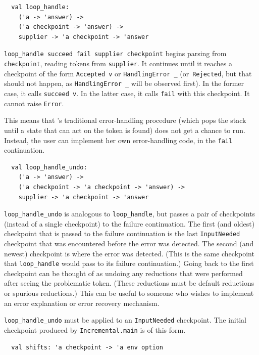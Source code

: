 \documentclass[onecolumn,11pt,nocopyrightspace,preprint]{sigplanconf}
\begin{document}
\begin{verbatim}
  val loop_handle:
    ('a -> 'answer) ->
    ('a checkpoint -> 'answer) ->
    supplier -> 'a checkpoint -> 'answer
\end{verbatim}

\verb+loop_handle succeed fail supplier checkpoint+ begins parsing from
\verb+checkpoint+, reading tokens from \verb+supplier+. It continues until
it reaches a checkpoint of the form \verb+Accepted v+ or \verb+HandlingError _+
(or~\verb+Rejected+, but that should not happen, as \verb+HandlingError _+
will be observed first). In the former case, it calls \verb+succeed v+. In
the latter case, it calls \verb+fail+ with this checkpoint. It cannot
raise \verb+Error+.

This means that \menhir's traditional error-handling procedure (which pops the
stack until a state that can act on the \error token is found) does not get a
chance to run. Instead, the user can implement her own error-handling code, in
the \verb+fail+ continuation.


\begin{verbatim}
  val loop_handle_undo:
    ('a -> 'answer) ->
    ('a checkpoint -> 'a checkpoint -> 'answer) ->
    supplier -> 'a checkpoint -> 'answer
\end{verbatim}

\verb+loop_handle_undo+ is analogous to \verb+loop_handle+, but passes a pair
of checkpoints (instead of a single checkpoint) to the failure continuation.
%
The first (and oldest) checkpoint that is passed to the failure continuation
is the last \verb+InputNeeded+ checkpoint that was encountered before the
error was detected. The second (and newest) checkpoint is where the error was
detected. (This is the same checkpoint that \verb+loop_handle+ would pass to
its failure continuation.) Going back to the first checkpoint can be thought
of as undoing any reductions that were performed after seeing the problematic
token. (These reductions must be default reductions or spurious reductions.)
This can be useful to someone who wishes to implement an error explanation or
error recovery mechanism.

\verb+loop_handle_undo+ must be applied to an \verb+InputNeeded+ checkpoint.
The initial checkpoint produced by \verb+Incremental.main+ is of this form.


\begin{verbatim}
  val shifts: 'a checkpoint -> 'a env option
\end{verbatim}
\end{document}
